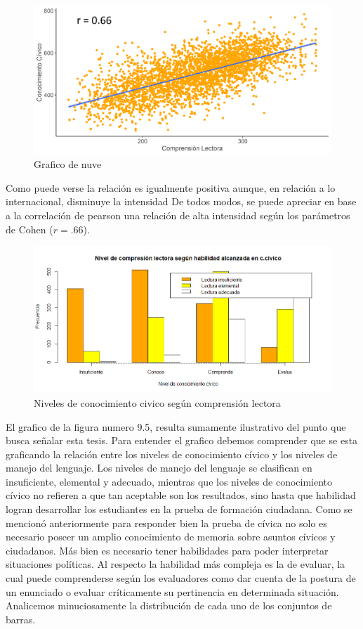 \documentclass[12pt,twoside]{templates/facsothesis}
\begin{document}
\begin{figure}[!ht]

{\centering \includegraphics[width=0.8\linewidth,]{images/scater} 

}

\caption{Grafico de nuve}\label{fig:unnamed-chunk-10}
\end{figure}

Como puede verse la relación es igualmente positiva aunque, en relación a lo internacional, disminuye la intensidad De todos modos, se puede apreciar en base a la correlación de pearson una relación de alta intensidad según los parámetros de Cohen (\(r= .66\)).

\begin{figure}[!ht]

{\centering \includegraphics[width=0.8\linewidth,]{images/barpot} 

}

\caption{Niveles de conocimiento civico según comprensión lectora}\label{fig:unnamed-chunk-11}
\end{figure}

El grafico de la figura numero 9.5, resulta sumamente ilustrativo del punto que busca señalar esta tesis. Para entender el grafico debemos comprender que se esta graficando la relación entre los niveles de conocimiento cívico y los niveles de manejo del lenguaje. Los niveles de manejo del lenguaje se clasifican en insuficiente, elemental y adecuado, mientras que los niveles de conocimiento cívico no refieren a que tan aceptable son los resultados, sino hasta que habilidad logran desarrollar los estudiantes en la prueba de formación ciudadana. Como se mencionó anteriormente para responder bien la prueba de cívica no solo es necesario poseer un amplio conocimiento de memoria sobre asuntos cívicos y ciudadanos. Más bien es necesario tener habilidades para poder interpretar situaciones políticas. Al respecto la habilidad más compleja es la de evaluar, la cual puede comprenderse según los evaluadores como dar cuenta de la postura de un enunciado o evaluar críticamente su pertinencia en determinada situación. Analicemos minuciosamente la distribución de cada uno de los conjuntos de barras.
\end{document}
